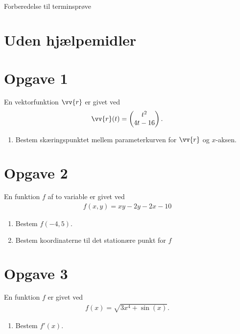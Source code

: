 
\begin{center}
	\Huge
	Forberedelse til terminsprøve
\end{center}

\section*{Uden hjælpemidler}
\section*{Opgave 1}

	En vektorfunktion $\vv{r}$ er givet ved
	\begin{align*}
		\vv{r}(t) = 
		\begin{pmatrix}
			t^2 \\
			4t-16
		\end{pmatrix}.
	\end{align*}
\begin{enumerate}[label=\roman*)]
	\item Bestem skæringspunktet mellem parameterkurven for $\vv{r}$ og $x$-aksen. 
\end{enumerate}

\section*{Opgave 2}

	En funktion $f$ af to variable er givet ved
	\begin{align*}
		f(x,y) = x y-2y-2x-10
	\end{align*}
\begin{enumerate}[label=\roman*)]
	\item Bestem $f(-4,5)$.
	\item Bestem koordinaterne til det stationære punkt for $f$
\end{enumerate}

\section*{Opgave 3}


	En funktion $f$ er givet ved
	\begin{align*}
		f(x) = \sqrt{3x^4+\sin(x)}.
	\end{align*}

\begin{enumerate}[label=\roman*)]
	\item	Bestem $f'(x)$.
\end{enumerate}

